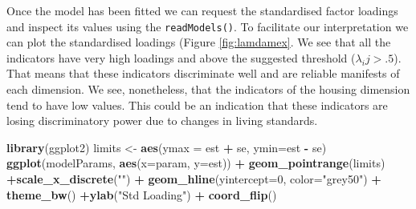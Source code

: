 \documentclass[]{book}
\newenvironment{Shaded}{\begin{snugshade}}{\end{snugshade}}
\newcommand{\DataTypeTok}[1]{\textcolor[rgb]{0.13,0.29,0.53}{#1}}
\newcommand{\DecValTok}[1]{\textcolor[rgb]{0.00,0.00,0.81}{#1}}
\newcommand{\KeywordTok}[1]{\textcolor[rgb]{0.13,0.29,0.53}{\textbf{#1}}}
\newcommand{\NormalTok}[1]{#1}
\newcommand{\OperatorTok}[1]{\textcolor[rgb]{0.81,0.36,0.00}{\textbf{#1}}}
\newcommand{\StringTok}[1]{\textcolor[rgb]{0.31,0.60,0.02}{#1}}
\begin{document}
Once the model has been fitted we can request the standardised factor loadings and inspect its values using the \texttt{readModels()}. To facilitate our interpretation we can plot the standardised loadings (Figure \ref{fig:lamdamex}. We see that all the indicators have very high loadings and above the suggested threshold (\(\lambda_ij>.5\)). That means that these indicators discriminate well and are reliable manifests of each dimension. We see, nonetheless, that the indicators of the housing dimension tend to have low values. This could be an indication that these indicators are losing discriminatory power due to changes in living standards.

\begin{Shaded}
\end{Shaded}

\begin{Shaded}
\begin{Highlighting}[]
\KeywordTok{library}\NormalTok{(ggplot2)}
\NormalTok{limits <-}\StringTok{ }\KeywordTok{aes}\NormalTok{(}\DataTypeTok{ymax =}\NormalTok{ est }\OperatorTok{+}\StringTok{ }\NormalTok{se, }\DataTypeTok{ymin=}\NormalTok{est }\OperatorTok{-}\StringTok{ }\NormalTok{se)}
 \KeywordTok{ggplot}\NormalTok{(modelParams, }\KeywordTok{aes}\NormalTok{(}\DataTypeTok{x=}\NormalTok{param, }\DataTypeTok{y=}\NormalTok{est)) }\OperatorTok{+}\StringTok{ }\KeywordTok{geom_pointrange}\NormalTok{(limits) }\OperatorTok{+}\KeywordTok{scale_x_discrete}\NormalTok{(}\StringTok{""}\NormalTok{) }\OperatorTok{+}
\StringTok{   }\KeywordTok{geom_hline}\NormalTok{(}\DataTypeTok{yintercept=}\DecValTok{0}\NormalTok{, }\DataTypeTok{color=}\StringTok{"grey50"}\NormalTok{) }\OperatorTok{+}\StringTok{ }\KeywordTok{theme_bw}\NormalTok{() }\OperatorTok{+}\KeywordTok{ylab}\NormalTok{(}\StringTok{"Std Loading"}\NormalTok{) }\OperatorTok{+}\StringTok{ }\KeywordTok{coord_flip}\NormalTok{()}
\end{Highlighting}
\end{Shaded}
\end{document}
